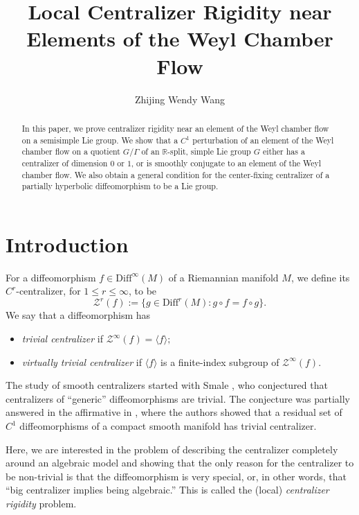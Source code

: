 \documentclass[11pt]{amsart}
\numberwithin{equation}{section}
\newcommand{\R}{\mathbb{R}}
\theoremstyle{plain}
\begin{document}
\title{Local Centralizer Rigidity near Elements of the Weyl Chamber Flow}
\author{Zhijing Wendy Wang}
\address{Yau Mathematical Sciences Centre, Tsinghua University, Beijing, China}
\address{Department of Mathematics, University of Chicago, Chicago, IL 60637, USA}



\maketitle
\begin{abstract}
In this paper, we prove centralizer rigidity near an element of the Weyl chamber flow on a semisimple Lie group. We show that a $C^1$ perturbation of an element of the Weyl chamber flow on a quotient $G/\Gamma$ of an $\R$-split, simple Lie group $G$ either has a centralizer of dimension $0$ or $1$, or is smoothly conjugate to an element of the Weyl chamber flow. We also obtain a general condition for the center-fixing centralizer of a partially hyperbolic diffeomorphism to be a Lie group.
\end{abstract}

\tableofcontents
\section{Introduction}

For a diffeomorphism $f\in \mathrm{Diff}^\infty(M)$ of a Riemannian manifold $M$, we define its $C^r$-centralizer, for $1\le r\le \infty$, to be
\[
\mathcal{Z}^r(f):=\{g\in \mathrm{Diff}^r(M): g\circ f=f\circ g\}.
\]
We say that a diffeomorphism has
\begin{itemize}
 \item \emph{trivial centralizer} if $\mathcal{Z}^\infty(f)=\langle f\rangle;$ 
 \item \emph{virtually trivial centralizer} if $\langle f\rangle$ is a finite-index subgroup of $\mathcal{Z}^\infty(f)$.
\end{itemize}

The study of smooth centralizers started with Smale \cite{smale}, who conjectured that centralizers of ``generic'' diffeomorphisms are trivial. The conjecture was partially answered in the affirmative in \cite{BCW}, where the authors showed that a residual set of $C^1$ diffeomorphisms of a compact smooth manifold has trivial centralizer.

Here, we are interested in the problem of describing the centralizer completely around an algebraic model and showing that the only reason for the centralizer to be non-trivial is that the diffeomorphism is very special, or, in other words, that ``big centralizer implies being algebraic.'' This is called the (local) \emph{centralizer rigidity} problem.
\end{document}

